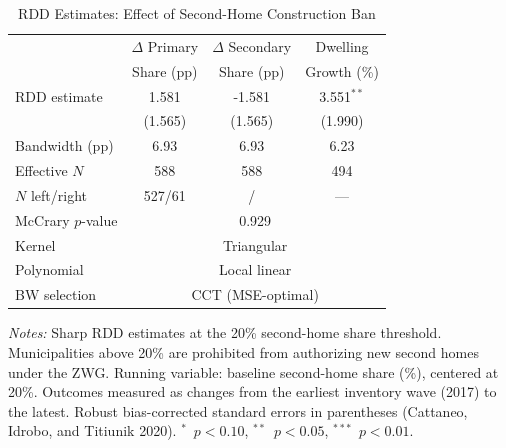\begin{table}[htbp]
\centering
\caption{RDD Estimates: Effect of Second-Home Construction Ban}
\label{tab:main_rdd}
\begin{tabular}{lccc}
\toprule
 & $\Delta$ Primary & $\Delta$ Secondary & Dwelling \\
 & Share (pp) & Share (pp) & Growth (\%) \\
\midrule
RDD estimate & 1.581 & -1.581 & 3.551$^{**}$ \\
 & (1.565) & (1.565) & (1.990) \\
\addlinespace
Bandwidth (pp) & 6.93 & 6.93 & 6.23 \\
Effective $N$ & 588 & 588 & 494 \\
$N$ left/right & 527/61 & / & --- \\
\addlinespace
McCrary $p$-value & \multicolumn{3}{c}{0.929} \\
Kernel & \multicolumn{3}{c}{Triangular} \\
Polynomial & \multicolumn{3}{c}{Local linear} \\
BW selection & \multicolumn{3}{c}{CCT (MSE-optimal)} \\
\bottomrule
\end{tabular}
\begin{tablenotes}[flushleft]\footnotesize
\item \textit{Notes:} Sharp RDD estimates at the 20\% second-home share threshold. Municipalities above 20\% are prohibited from authorizing new second homes under the ZWG. Running variable: baseline second-home share (\%), centered at 20\%. Outcomes measured as changes from the earliest inventory wave (2017) to the latest. Robust bias-corrected standard errors in parentheses (Cattaneo, Idrobo, and Titiunik 2020). $^{*}$~$p<0.10$, $^{**}$~$p<0.05$, $^{***}$~$p<0.01$.
\end{tablenotes}
\end{table}
